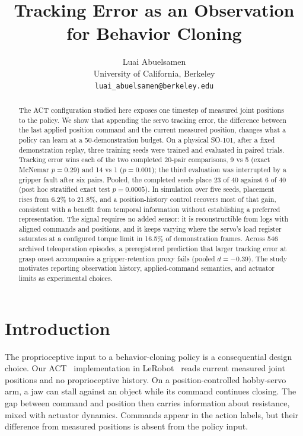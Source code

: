 \documentclass{article}
\title{Tracking Error as an Observation for Behavior Cloning}
\author{Luai Abuelsamen\\University of California, Berkeley\\
\texttt{luai\_abuelsamen@berkeley.edu}}
\begin{document}
\maketitle

\begin{abstract}
The ACT configuration studied here exposes one timestep of measured
joint positions to the policy. We show that appending the servo tracking
error, the difference between the last applied position command and the
current measured position, changes what a policy can learn at a
50-demonstration budget. On a physical SO-101, after a fixed demonstration
replay, three training seeds were trained and evaluated in paired trials.
Tracking error wins each of the two completed 20-pair comparisons, 9 vs 5
(exact McNemar $p=0.29$) and 14 vs 1 ($p=0.001$); the third evaluation was
interrupted by a gripper fault after six pairs. Pooled, the completed seeds
place 23 of 40 against 6 of 40 (post hoc stratified exact test $p=0.0005$).
In simulation over five seeds, placement rises from
6.2\% to 21.8\%, and a position-history control recovers most of that gain,
consistent with a benefit from temporal information without establishing a
preferred representation. The signal requires no added sensor:
it is reconstructible from logs with aligned commands and positions,
and it keeps varying where the servo's load register saturates at a configured
torque limit in 16.5\% of demonstration frames. Across 546 archived
teleoperation episodes, a preregistered prediction that larger tracking error
at grasp onset accompanies a gripper-retention proxy fails (pooled $d=-0.39$).
The study motivates reporting observation history, applied-command semantics,
and actuator limits as experimental choices.
\end{abstract}

\section{Introduction}
The proprioceptive input to a behavior-cloning policy is a consequential
design choice. Our ACT~\citep{zhao2023act} implementation in
LeRobot~\citep{cadene2026lerobot} reads current measured joint positions and
no proprioceptive history. On a position-controlled hobby-servo arm, a jaw
can stall against an object while its command continues closing. The gap
between command and position then carries information about resistance, mixed
with actuator dynamics. Commands appear in the action labels, but their
difference from measured positions is absent from the policy input.
\end{document}
